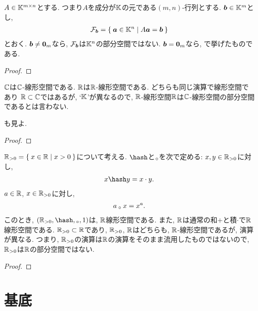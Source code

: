\begin{example}
  \label{subsp:nonexample:fiber}
  $A\in \mathbb{K}^{m\times n}$とする.
  つまり$A$を成分が$\mathbb{K}$の元である$(m,n)$-行列とする.
  $\boldsymbol{b}\in \mathbb{K}^m$とし,
  \begin{align*}
    \mathcal{F}_{\boldsymbol{b}}=\Set{\boldsymbol{a}\in \mathbb{K}^n|A\boldsymbol{a}=\boldsymbol{b}}
  \end{align*}
  とおく.
  $\boldsymbol{b}\neq \boldsymbol{0}_m$なら,
  $\mathcal{F}_{\boldsymbol{b}}$は$\mathbb{K}^n$の部分空間ではない.
  $\boldsymbol{b}= \boldsymbol{0}_m$なら,
  で挙げたものである.
\end{example}
\begin{proof}\end{proof}



\begin{example}
  \label{subsp:nonexample:cc}
  $\mathbb{C}$は$\mathbb{C}$-線形空間である.
  $\mathbb{R}$は$\mathbb{R}$-線形空間である.
  どちらも同じ演算で線形空間であり
  $\mathbb{R}\subset \mathbb{C}$ではあるが,
  `$\mathbb{K}$'が異なるので,
  $\mathbb{R}$-線形空間$\mathbb{R}$は$\mathbb{C}$-線形空間の部分空間であるとは言わない.

  も見よ.
\end{example}
\begin{proof}\end{proof}

\begin{example}
  $\mathbb{R}_{>0}=\Set{x\in\mathbb{R}|x>0}$について考える.
  $\pplus$と$\mathbin{{}_\circ}$を次で定める:
  $x,y\in\mathbb{R}_{>0}$に対し,
  \begin{align*}
    x\pplus y =x\cdot y.
  \end{align*}
  $a\in\mathbb{R}$, $x\in\mathbb{R}_{>0}$に対し,
  \begin{align*}
    a\mathbin{{}_\circ} x=x^a.
  \end{align*}
  このとき, $(\RR_{>0},\pplus,\aact,1)$は, $\mathbb{R}$線形空間である.
  また, $\mathbb{R}$は通常の和$+$と積$\cdot$で$\mathbb{R}$線形空間である.
  $\mathbb{R}_{>0}\subset \mathbb{R}$であり, $\mathbb{R}_{>0}$, $\mathbb{R}$はどちらも, $\mathbb{R}$-線形空間であるが, 演算が異なる.
  つまり, $\mathbb{R}_{>0}$の演算は$\mathbb{R}$の演算をそのまま流用したものではないので,
  $\mathbb{R}_{>0}$は$\mathbb{R}$の部分空間ではない.
\end{example}
\begin{proof}\end{proof}

\begin{quiz}
\end{quiz}


\chapter{基底}
